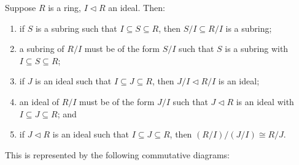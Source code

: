\begin{theorem}\label{thm:iso-3-ring}
    Suppose \(R\) is a ring, \(I \lhd R\) an ideal. Then:
    \begin{enumerate}[label={(\alph*)}, itemsep=0mm]
        \item if \(S\) is a subring such that \(I \subseteq S \subseteq R\),
            then \(S/I \subseteq R/I\) is a subring;
        \item a subring of \(R/I\) must be of the form \(S/I\)
            such that \(S\) is a subring with \(I \subseteq S \subseteq R\);
        \item if \(J\) is an ideal such that \(I \subseteq J \subseteq R\),
            then \(J/I \lhd R/I\) is an ideal;
        \item an ideal of \(R/I\) must be of the form \(J/I\)
            such that \(J \lhd R\) is an ideal
            with \(I \subseteq J \subseteq R\); and
        \item if \(J \lhd R\) is an ideal such that \(I \subseteq J \subseteq R\),
            then \((R/I)/(J/I) \cong R/J\).
    \end{enumerate}

    This is represented by the following commutative diagrams:
    \begin{center}
         \qquad
    \end{center}
\end{theorem}
